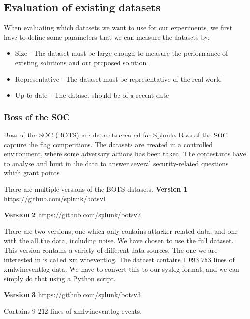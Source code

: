 \subsection{Evaluation of existing datasets}
\label{sub:evaluation-of-existing-datasets}
When evaluating which datasets we want to use for our experiments, we first have to define some parameters that we can measure the datasets by:
\begin{itemize}
    \item Size - The dataset must be large enough to measure the performance of existing solutions and our proposed solution.
    \item Representative - The dataset must be representative of the real world
    \item Up to date - The dataset should be of a recent date 
\end{itemize}

\subsubsection{Boss of the SOC}
Boss of the SOC (BOTS) are datasets created for Splunks Boss of the SOC capture the flag competitions. The datasets are created in a controlled environment, where some adversary actions has been taken. The contestants have to analyze and hunt in the data to answer several security-related questions which grant points.


There are multiple versions of the BOTS datasets.
\textbf{Version 1}
\url{https://github.com/splunk/botsv1}


\textbf{Version 2}
\url{https://github.com/splunk/botsv2}

There are two versions; one which only contains attacker-related data, and one with the all the data, including noise. We have chosen to use the full dataset. This version contains a variety of different data sources. The one we are interested in is called xmlwineventlog. The dataset contains 1 093 753 lines of xmlwineventlog data. We have to convert this to our syslog-format, and we can simply do that using a Python script.


\textbf{Version 3}
\url{https://github.com/splunk/botsv3}

Contains 9 212 lines of xmlwineventlog events.

